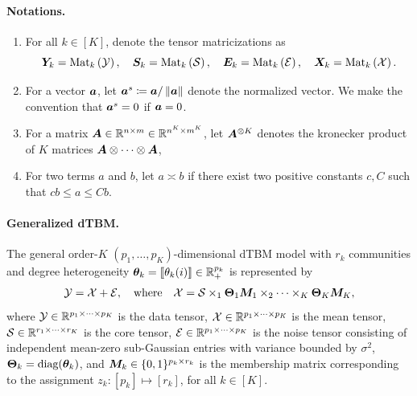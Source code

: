 \documentclass[lettersize,onecolumn,journal]{IEEEtran}
\theoremstyle{definition}
\theoremstyle{definition}
\newcommand{\of}[1]{\left(#1\right)}
\begin{document}
\paragraph{Notations.}
\begin{enumerate}
    \item For all $ k \in [K]$, denote the tensor matricizations as
    \begin{equation}
        \mY_k = \mat_k \of{ \tY }, \quad \mS_k = \mat_k \of{\tS}, \quad \mE_k = \mat_k \of{ \tE}, \quad \mX_k = \mat_k \of{\tX}.
    \end{equation}
    \item For a vector $\bm{a}$, let $\bm{a}^{s} \coloneqq \bm{a}/\left\lVert\bm{a}\right\rVert$ denote the normalized vector. We make the convention that $\bm{a}^s = 0$ if $\bm{a} = 0$. 
    \item For a matrix $\bm A \in \mathbb{R}^{n \times m} \in \mathbb{R}^{n^K \times m^K}$, let $\bm A^{\otimes K}$ denotes the kronecker product of $K$ matrices $\bm A \otimes \cdots \otimes \bm A$,
    \item For two terms $a$ and $b$, let $a \asymp b$ if there exist two positive constants $c, C$ such that $cb \leq a\leq Cb$. 
\end{enumerate}


 \paragraph{Generalized dTBM.} 
 
 The general order-$K$ $(p_1, \ldots, p_K)$-dimensional dTBM model with $r_k$ communities and degree heterogeneity $\boldsymbol{\theta}_k = \llbracket \theta_k(i) \rrbracket \in \mathbb{R}_+^{p_k}$ is represented by
\begin{equation}\label{eq:general_dtbm}
    \tY = \tX+ \tE,\quad \text{where}\quad \tX=\tS \times_1 \mTheta_1 \mM_1 \times_2 \cdots \times_K \mTheta_K \mM_K,
\end{equation}
where $\mathcal{Y} \in \mathbb{R}^{p_1 \times \cdots \times p_K}$ is the data tensor, $\mathcal{X}\in \mathbb{R}^{p_1\times \cdots \times p_K}$ is the mean tensor, $\mathcal{S} \in \mathbb{R}^{r_1 \times \cdots \times r_K}$ is the core tensor, $\mathcal{E} \in \mathbb{R}^{p_1 \times \cdots \times p_K}$ is the noise tensor consisting of independent mean-zero sub-Gaussian entries with variance bounded by $\sigma^2$, $\boldsymbol{\Theta}_k = \text{diag}(\boldsymbol{\theta}_k)$, and $\bm M_k\in \{0,1\}^{p_k \times r_k}$ is the membership matrix corresponding to the assignment $z_k: [p_k] \mapsto [r_k]$, for all $k \in [K]$. 
\end{document}
